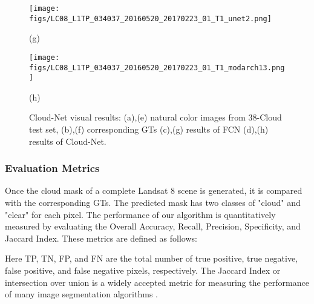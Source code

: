 \documentclass{article}
\begin{document}
\begin{figure}[htb]
\begin{minipage}{0.2\textwidth}
\end{minipage}
\begin{minipage}{0.2\textwidth}
\centering
\centerline{\texttt{[image: figs/LC08\_L1TP\_034037\_20160520\_20170223\_01\_T1\_unet2.png]}}
\footnotesize{(g)}
\end{minipage}
\vspace{1mm}
\hspace{5mm}
\begin{minipage}{0.2\textwidth}
\centering
\centerline{\texttt{[image: figs/LC08\_L1TP\_034037\_20160520\_20170223\_01\_T1\_modarch13.png]}}
\footnotesize{(h)}
\end{minipage}
\hspace{-1mm}  
\setlength{\abovecaptionskip}{2mm}
\caption{\footnotesize Cloud-Net visual results: (a),(e) natural color images from 38-Cloud test set, (b),(f) corresponding GTs (c),(g) results of FCN \cite{mymmsp} (d),(h) results of Cloud-Net.\label{Fig:samples}}
\end{figure}





\subsubsection{Evaluation Metrics}
Once the cloud mask of a complete Landsat 8 scene is generated, it is compared with the corresponding GTs. The predicted mask has two classes of "cloud" and "clear" for each pixel. The performance of our algorithm is quantitatively measured by evaluating the Overall Accuracy, Recall, Precision, Specificity, and Jaccard Index. These metrics are defined as follows:

\vspace{-5mm}



Here TP, TN, FP, and FN are the total number of true positive, true negative, false positive, and false negative pixels, respectively. The Jaccard Index or intersection over union is a widely accepted metric for measuring the performance of many image segmentation algorithms \cite{mymmsp}.
\end{document}
